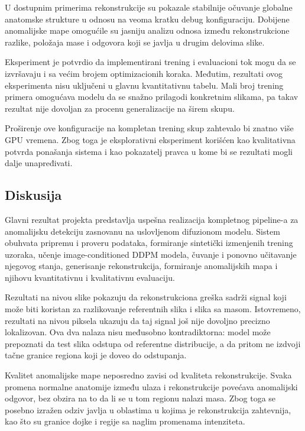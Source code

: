 \documentclass[10pt]{article}
\begin{document}
	U dostupnim primerima rekonstrukcije su pokazale stabilnije očuvanje globalne anatomske strukture u odnosu na veoma kratku debug konfiguraciju. Dobijene anomalijske mape omogućile su jasniju analizu odnosa između rekonstrukcione razlike, položaja mase i odgovora koji se javlja u drugim delovima slike.
	
	Eksperiment je potvrdio da implementirani trening i evaluacioni tok mogu da se izvršavaju i sa većim brojem optimizacionih koraka. Međutim, rezultati ovog eksperimenta nisu uključeni u glavnu kvantitativnu tabelu. Mali broj trening primera omogućava modelu da se snažno prilagodi konkretnim slikama, pa takav rezultat nije dovoljan za procenu generalizacije na širem skupu.
	
	Proširenje ove konfiguracije na kompletan trening skup zahtevalo bi znatno više GPU vremena. Zbog toga je eksplorativni eksperiment korišćen kao kvalitativna potvrda ponašanja sistema i kao pokazatelj pravca u kome bi se rezultati mogli dalje unapređivati.
	
	\subsection{Diskusija}
	
	Glavni rezultat projekta predstavlja uspešna realizacija kompletnog pipeline-a za anomalijsku detekciju zasnovanu na uslovljenom difuzionom modelu. Sistem obuhvata pripremu i proveru podataka, formiranje sintetički izmenjenih trening uzoraka, učenje image-conditioned DDPM modela, čuvanje i ponovno učitavanje njegovog stanja, generisanje rekonstrukcija, formiranje anomalijskih mapa i njihovu kvantitativnu i kvalitativnu evaluaciju.
	
	Rezultati na nivou slike pokazuju da rekonstrukciona greška sadrži signal koji može biti koristan za razlikovanje referentnih slika i slika sa masom. Istovremeno, rezultati na nivou piksela ukazuju da taj signal još nije dovoljno precizno lokalizovan. Ova dva nalaza nisu međusobno kontradiktorna: model može prepoznati da test slika odstupa od referentne distribucije, a da pritom ne izdvoji tačne granice regiona koji je doveo do odstupanja.
	
	Kvalitet anomalijske mape neposredno zavisi od kvaliteta rekonstrukcije. Svaka promena normalne anatomije između ulaza i rekonstrukcije povećava anomalijski odgovor, bez obzira na to da li se u tom regionu nalazi masa. Zbog toga se posebno izražen odziv javlja u oblastima u kojima je rekonstrukcija zahtevnija, kao što su granice dojke i regije sa naglim promenama intenziteta.
	
\end{document}

